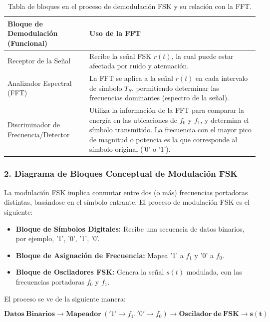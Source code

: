 \documentclass[letter,12pt]{article}
\begin{document}
\begin{table}[H]
\centering
\begin{tabularx}{0.98\linewidth}{|l|X|}
\hline
\textbf{Bloque de Demodulación (Funcional)} & \textbf{Uso de la FFT} \\ \hline
Receptor de la Señal  & Recibe la señal FSK \( r(t) \), la cual puede estar afectada por ruido y atenuación. \\ \hline
Analizador Espectral (FFT) & La FFT se aplica a la señal \( r(t) \) en cada intervalo de símbolo \( T_S \), permitiendo determinar las frecuencias dominantes (espectro de la señal). \\ \hline
Discriminador de Frecuencia/Detector & Utiliza la información de la FFT para comparar la energía en las ubicaciones de \( f_0 \) y \( f_1 \), y determina el símbolo transmitido. La frecuencia con el mayor pico de magnitud o potencia es la que corresponde al símbolo original ('0' o '1'). \\ \hline
\end{tabularx}
\caption{Tabla de bloques en el proceso de demodulación FSK y su relación con la FFT.}
\end{table}

\subsubsection{2. Diagrama de Bloques Conceptual de Modulación FSK}

La modulación FSK implica conmutar entre dos (o más) frecuencias portadoras distintas, basándose en el símbolo entrante. El proceso de modulación FSK es el siguiente:

\begin{itemize}
    \item \textbf{Bloque de Símbolos Digitales:} Recibe una secuencia de datos binarios, por ejemplo, '1', '0', '1', '0'.
    \item \textbf{Bloque de Asignación de Frecuencia:} Mapea '1' a \( f_1 \) y '0' a \( f_0 \).
    \item \textbf{Bloque de Osciladores FSK:} Genera la señal \( s(t) \) modulada, con las frecuencias portadoras \( f_0 \) y \( f_1 \).
\end{itemize}

El proceso se ve de la siguiente manera:

$$ \mathbf{Datos\ Binarios} \longrightarrow \mathbf{Mapeador\ } ('1' \to f_1, '0' \to f_0) \longrightarrow \mathbf{Oscilador\ de\ FSK} \longrightarrow \mathbf{s(t)} $$
\end{document}
